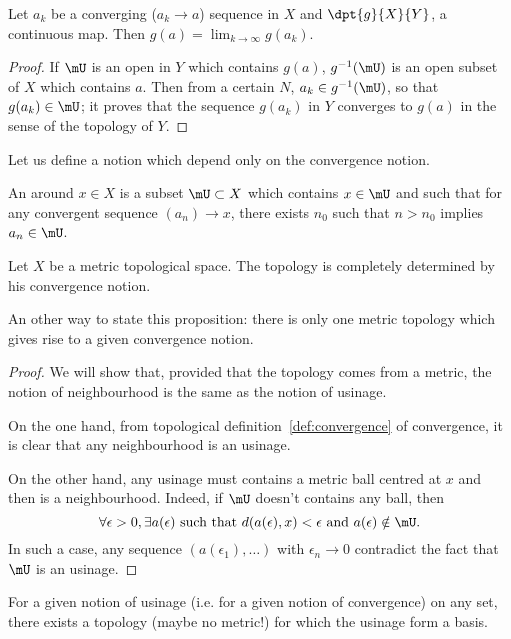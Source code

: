 \begin{proposition}
Let $a_k$ be a converging ($a_k\to a$) sequence in $X$ and $\dpt{g}{X}{Y}$, a continuous map. Then $g(a)=\lim_{k\to\infty}g(a_k)$.
\label{prop:continu_cv}
\end{proposition}
\begin{proof}
If $\mU$ is an open in $Y$ which contains $g(a)$, $g^{-1}(\mU)$ is an open subset of $X$ which contains $a$. Then from a certain $N$, $a_k\in g^{-1}(\mU)$, so that $g(a_k)\in\mU$; it proves that the sequence $g(a_k)$ in $Y$ converges to $g(a)$ in the sense of the topology of $Y$.
\end{proof}

Let us define a notion which depend only on the convergence notion.

\begin{definition}
An  around $x\in X$ is a subset $\mU\subset X$ which contains $x\in\mU$ and such that for any convergent sequence $(a_n)\to x$, there exists $n_0$ such that $n>n_0$ implies $a_n\in\mU$.
\end{definition}

\begin{lemma}
Let $X$ be a metric topological space. The topology is completely determined by his convergence notion.

An other way to state this proposition: there is only one metric topology which gives rise to a given convergence notion. \label{prop:usinage}
\end{lemma}
\begin{proof}
We will show that, provided that the topology comes from a metric, the notion of neighbourhood is the same as the notion of usinage.

On the one hand, from topological definition~\ref{def:convergence} of convergence, it is clear that any neighbourhood is an usinage.

On the other hand, any usinage must contains a metric ball centred at $x$ and then is a neighbourhood. Indeed, if $\mU$ doesn't contains any ball, then
\[
 \forall\epsilon>0,\exists a(\epsilon)\text{ such that } d(a(\epsilon),x)<\epsilon \text{ and } a(\epsilon)\notin\mU.
\]
%
In such a case, any sequence $( a(\epsilon_1),\ldots )$ with $\epsilon_n\to 0$ contradict the fact that $\mU$ is an usinage.
\end{proof}

\begin{proposition}
For a given notion of usinage (i.e. for a given notion of convergence) on any set, there exists a topology (maybe no metric!) for which the usinage form a basis.
\end{proposition}

